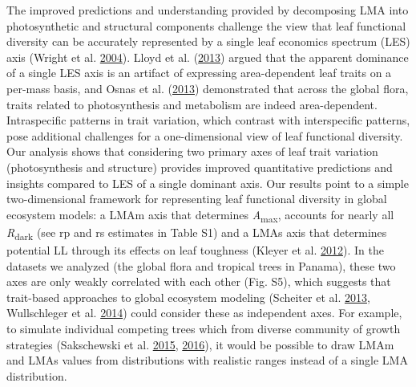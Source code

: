 \documentclass[
  12pt,
]{article}
\begin{document}
The improved predictions and understanding provided by decomposing LMA into photosynthetic and structural components challenge the view that leaf functional diversity can be accurately represented by a single leaf economics spectrum (LES) axis (Wright et al. \protect\hyperlink{ref-Wright2004a}{2004}).
Lloyd et al. (\protect\hyperlink{ref-Lloyd2013}{2013}) argued that the apparent dominance of a single LES axis is an artifact of expressing area-dependent leaf traits on a per-mass basis, and Osnas et al. (\protect\hyperlink{ref-Osnas2013}{2013}) demonstrated that across the global flora, traits related to photosynthesis and metabolism are indeed area-dependent.
Intraspecific patterns in trait variation, which contrast with interspecific patterns, pose additional challenges for a one-dimensional view of leaf functional diversity. Our analysis shows that considering two primary axes of leaf trait variation (photosynthesis and structure) provides improved quantitative predictions and insights compared to LES of a single dominant axis.
Our results point to a simple two-dimensional framework for representing leaf functional diversity in global ecosystem models: a LMAm axis that determines \emph{A}\textsubscript{max}, accounts for nearly all \emph{R}\textsubscript{dark} (see rp and rs estimates in Table S1) and a LMAs axis that determines potential LL through its effects on leaf toughness (Kleyer et al. \protect\hyperlink{ref-Kleyer2012}{2012}).
In the datasets we analyzed (the global flora and tropical trees in Panama), these two axes are only weakly correlated with each other (Fig. S5), which suggests that trait-based approaches to global ecosystem modeling (Scheiter et al. \protect\hyperlink{ref-Scheiter2013}{2013}, Wullschleger et al. \protect\hyperlink{ref-Wullschleger2014}{2014}) could consider these as independent axes.
For example, to simulate individual competing trees which from diverse community of growth strategies (Sakschewski et al. \protect\hyperlink{ref-Sakschewski2015}{2015}, \protect\hyperlink{ref-Sakschewski2016}{2016}), it would be possible to draw LMAm and LMAs values from distributions with realistic ranges instead of a single LMA distribution.
\end{document}
